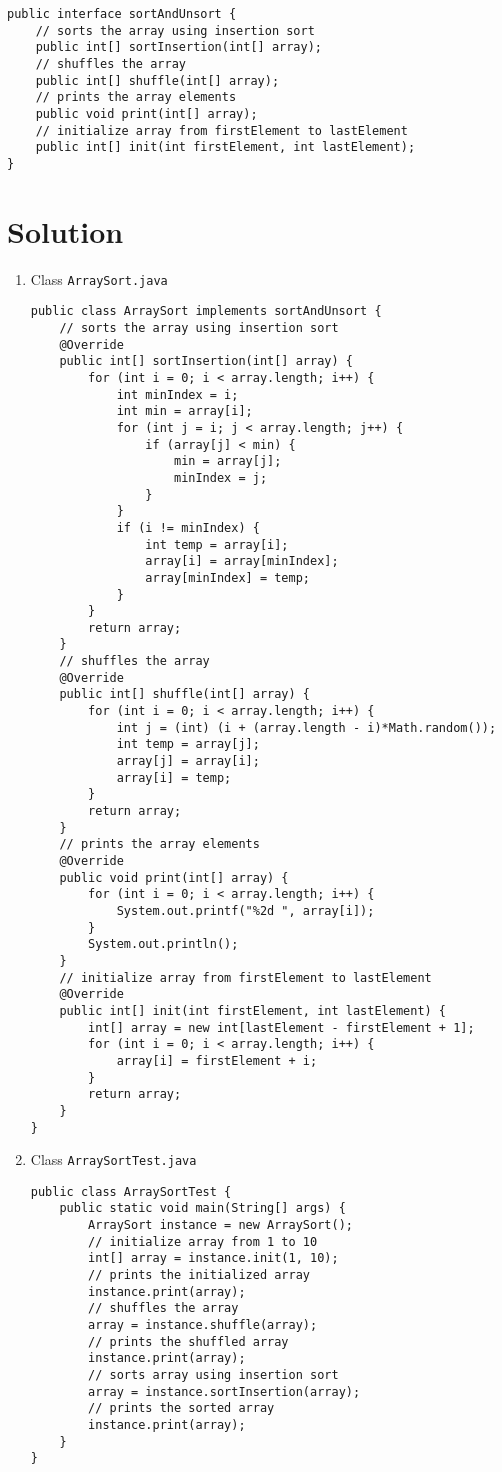 \lstset{language=java,tabsize=2}
\begin{lstlisting}
public interface sortAndUnsort {
	// sorts the array using insertion sort
	public int[] sortInsertion(int[] array);
	// shuffles the array
	public int[] shuffle(int[] array);
	// prints the array elements
	public void print(int[] array);
	// initialize array from firstElement to lastElement
	public int[] init(int firstElement, int lastElement);
}
\end{lstlisting}

\section*{Solution}

\begin{enumerate}
\item Class \texttt{ArraySort.java}

\lstset{language=java, tabsize=2}
\begin{lstlisting}
public class ArraySort implements sortAndUnsort {
	// sorts the array using insertion sort
	@Override
	public int[] sortInsertion(int[] array) {
		for (int i = 0; i < array.length; i++) {
			int minIndex = i;
			int min = array[i];
			for (int j = i; j < array.length; j++) {
				if (array[j] < min) {
					min = array[j];
					minIndex = j;
				}
			}
			if (i != minIndex) {
				int temp = array[i];
				array[i] = array[minIndex];
				array[minIndex] = temp;
			}
		}
		return array;
	}
	// shuffles the array
	@Override
	public int[] shuffle(int[] array) {
		for (int i = 0; i < array.length; i++) {
			int j = (int) (i + (array.length - i)*Math.random());
			int temp = array[j];
			array[j] = array[i];
			array[i] = temp;
		}
		return array;
	}
	// prints the array elements
	@Override
	public void print(int[] array) {
		for (int i = 0; i < array.length; i++) {
			System.out.printf("%2d ", array[i]);
		}
		System.out.println();
	}
	// initialize array from firstElement to lastElement
	@Override
	public int[] init(int firstElement, int lastElement) {
		int[] array = new int[lastElement - firstElement + 1];
		for (int i = 0; i < array.length; i++) {
			array[i] = firstElement + i;
		}
		return array;
	}
}
\end{lstlisting}

\item Class \texttt{ArraySortTest.java}

\lstset{language=java,tabsize=2}
\begin{lstlisting}
public class ArraySortTest {
	public static void main(String[] args) {
		ArraySort instance = new ArraySort();
		// initialize array from 1 to 10
		int[] array = instance.init(1, 10);
		// prints the initialized array
		instance.print(array);
		// shuffles the array
		array = instance.shuffle(array);
		// prints the shuffled array
		instance.print(array);
		// sorts array using insertion sort
		array = instance.sortInsertion(array);
		// prints the sorted array
		instance.print(array);
	}
}
\end{lstlisting}


\end{enumerate}
